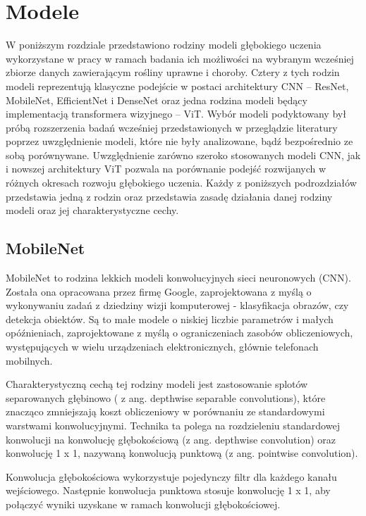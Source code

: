 \newpage %
\section{Modele}
\label{sec:modele}
W poniższym rozdziale przedstawiono rodziny modeli głębokiego uczenia wykorzystane w pracy w ramach badania ich możliwości na wybranym wcześniej zbiorze danych zawierającym rośliny uprawne i choroby. Cztery z tych rodzin modeli reprezentują klasyczne podejście w postaci architektury CNN – ResNet, MobileNet, EfficientNet i DenseNet oraz jedna rodzina modeli będący implementacją transformera wizyjnego – ViT.  Wybór modeli podyktowany był próbą rozszerzenia badań wcześniej przedstawionych w przeglądzie literatury poprzez uwzględnienie modeli, które nie były analizowane, bądź bezpośrednio ze sobą porównywane. Uwzględnienie zarówno szeroko stosowanych modeli CNN, jak \newline i nowszej architektury ViT pozwala na porównanie podejść rozwijanych w różnych okresach rozwoju głębokiego uczenia. Każdy z poniższych podrozdziałów przedstawia jedną \newline z rodzin oraz przedstawia zasadę działania danej rodziny modeli oraz jej charakterystyczne cechy.   
\subsection{MobileNet}
MobileNet to rodzina lekkich modeli konwolucyjnych sieci neuronowych (CNN). Została ona opracowana przez firmę Google, zaprojektowana z myślą  o wykonywaniu zadań z dziedziny wizji komputerowej - klasyfikacja obrazów, czy detekcja obiektów. Są to małe modele o niskiej liczbie parametrów i małych opóźnieniach, zaprojektowane z myślą \newline o ograniczeniach zasobów obliczeniowych, występujących w wielu urządzeniach elektronicznych, głównie telefonach mobilnych.

Charakterystyczną cechą tej rodziny modeli jest zastosowanie splotów separowanych głębinowo ( z ang. depthwise separable convolutions), które znacząco zmniejszają koszt obliczeniowy w porównaniu ze standardowymi warstwami konwolucyjnymi. Technika ta polega  na rozdzieleniu standardowej konwolucji na konwolucję głębokościową (z ang. depthwise convolution) oraz konwolucję 1 x 1, nazywaną konwolucją punktową (z ang. pointwise convolution). 
 
 Konwolucja głębokościowa wykorzystuje pojedynczy filtr dla każdego kanału wejściowego. Następnie konwolucja punktowa stosuje konwolucję 1 x 1, aby połączyć wyniki uzyskane w ramach  konwolucji głębokościowej. 
 
